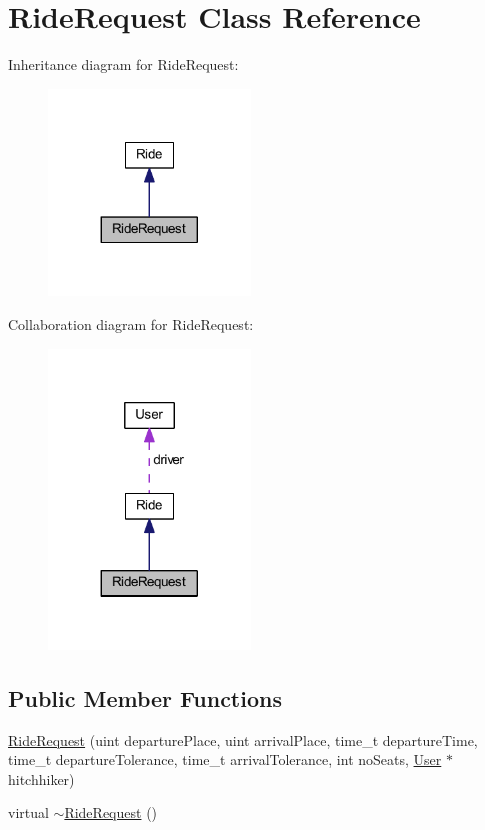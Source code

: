 \hypertarget{class_ride_request}{}\section{Ride\+Request Class Reference}
\label{class_ride_request}


Inheritance diagram for Ride\+Request\+:
\nopagebreak
\begin{figure}[H]
\begin{center}
\leavevmode
\includegraphics[width=152pt]{class_ride_request__inherit__graph}
\end{center}
\end{figure}


Collaboration diagram for Ride\+Request\+:
\nopagebreak
\begin{figure}[H]
\begin{center}
\leavevmode
\includegraphics[width=152pt]{class_ride_request__coll__graph}
\end{center}
\end{figure}
\subsection*{Public Member Functions}
\begin{DoxyCompactItemize}
\item 
\hyperlink{class_ride_request_a58874aa113243ac8e5e6a2bf68a96037}{Ride\+Request} (uint departure\+Place, uint arrival\+Place, time\+\_\+t departure\+Time, time\+\_\+t departure\+Tolerance, time\+\_\+t arrival\+Tolerance, int no\+Seats, \hyperlink{class_user}{User} $\ast$hitchhiker)
\item 
virtual \hyperlink{class_ride_request_a0c37241ff14f6c423ca576159e3d8b19}{$\sim$\+Ride\+Request} ()
\end{DoxyCompactItemize}
